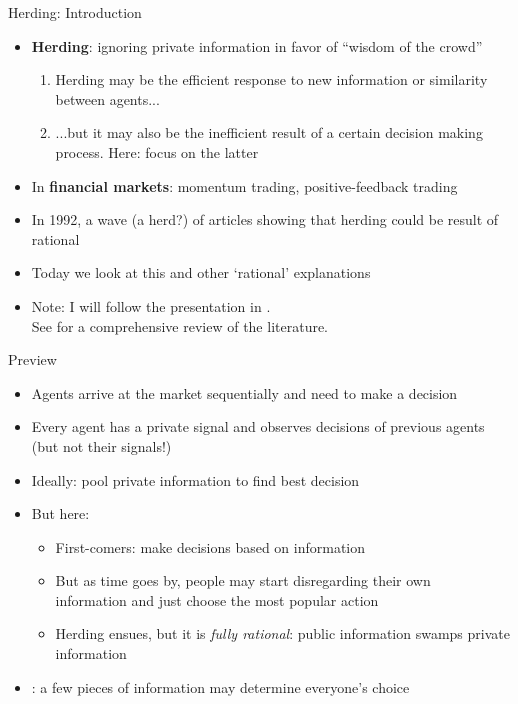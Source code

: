 \documentclass[english,10pt
,aspectratio=169
]{beamer}
\begin{document}
\begin{frame}{Herding: Introduction}
	\begin{itemize}
		\item \textbf{Herding}: ignoring private information in favor of ``wisdom of the crowd''
		\begin{enumerate}
			\item Herding may be the efficient response to new information or similarity between agents...
			\item ...but it may also be the inefficient result of a certain decision making process. Here: focus on the latter
		\end{enumerate}
		\item In \textbf{financial markets}: momentum trading, positive-feedback trading
		\item In 1992, a wave (a herd?) of articles showing that  herding could be result of rational 
		\item Today we look at this and other `rational' explanations
		\item Note: I will follow the presentation in \cite{bikhchandani_herd_2000}. 
		\\See \cite{bikhchandani_information_2024} for a comprehensive review of the literature.
	\end{itemize}
\end{frame}


\begin{frame}{Preview}
	\begin{itemize}
		\item Agents arrive at the market sequentially and need to make a decision
		\item Every agent has a private signal and observes decisions of previous agents (but not their signals!)
		\item Ideally: pool private information to find best decision
		\item But here: 
		\begin{itemize}
			\item First-comers: make decisions based on information
			\item But as time goes by, people may start disregarding their own
			\\ information and just choose the most popular action
			\item Herding ensues, but it is \emph{fully rational}: public information swamps private information
		\end{itemize}
		\item {}: a few pieces of information may determine everyone's choice
	\end{itemize}
\end{frame}
\end{document}
